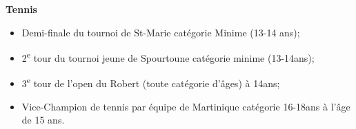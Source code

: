 \documentclass[margin]{res}
\begin{document}
\begin{resume}
  {\bf Tennis}
  \begin{itemize} \itemsep -2pt %

  \item Demi-finale du tournoi de St-Marie cat\'egorie Minime (13-14 ans);
  \item 2\textsuperscript{e} tour du tournoi jeune de Spourtoune cat\'egorie minime (13-14ans);
  \item 3\textsuperscript{e} tour de l’open du Robert (toute cat\'egorie d'\^ages) à 14ans;
  \item Vice-Champion de tennis par \'equipe de Martinique cat\'egorie 16-18ans à l'\^age de 15 ans.
  \end{itemize}


\end{resume} 
\end{document}
